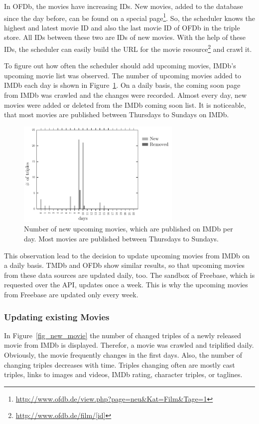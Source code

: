 In OFDb, the movies have increasing IDs.
New movies, added to the database since the day before, can be found on a special page\footnote{\url{http://www.ofdb.de/view.php?page=neu&Kat=Film&Tage=1}}.
So, the scheduler knows the highest and latest movie ID and also the last movie ID of OFDb in the triple store.
All IDs between these two are IDs of new movies.
With the help of these IDs, the scheduler can easily build the URL for the movie resource\footnote{\url{http://www.ofdb.de/film/[id]}} and crawl it.

To figure out how often the scheduler should add upcoming movies, IMDb's upcoming movie list was observed.
The number of upcoming movies added to IMDb each day is shown in Figure~\ref{fig_coming_soon_movie}.
On a daily basis, the coming soon page from IMDb was crawled and the changes were recorded.
Almost every day, new movies were added or deleted from the IMDb coming soon list.
It is noticeable, that most movies are published between Thursdays to Sundays on IMDb.

\begin{figure}[h!]
  \begin{center}
  \includegraphics[width=0.7\textwidth]{images/updating_1.pdf}
  \end{center}
  \caption{Number of new upcoming movies, which are published on IMDb per day. Most movies are published between Thursdays to Sundays.}
  \label{fig_coming_soon_movie}
\end{figure}

This observation lead to the decision to update upcoming movies from IMDb on a daily basis.
TMDb and OFDb show similar results, so that upcoming movies from these data sources are updated daily, too.
The sandbox of Freebase, which is requested over the API, updates once a week.
This is why the upcoming movies from Freebase are updated only every week.

\subsubsection{Updating existing Movies}
In Figure~\ref{fig_new_movie} the number of changed triples of a newly released movie from IMDb is displayed.
Therefor, a movie was crawled and triplified daily.
Obviously, the movie frequently changes in the first days.
Also, the number of changing triples decreases with time.
Triples changing often are mostly cast triples, links to images and videos, IMDb rating, character triples, or taglines.

